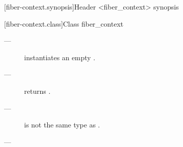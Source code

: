 
[fiber-context.synopsis]{Header <fiber\_context> synopsis}


[fiber-context.class]{Class fiber\_context}


\label{constructor}

\effects
\begin{description}
    \item[---] instantiates an empty \fiber.
\end{description}

\postcond
\begin{description}
    \item[---]  returns .
\end{description}


\constraints
\begin{description}
    \item[---]  is not the same type as .
\end{description}

\mandates
\begin{description}
    \item[---] 
\end{description}


